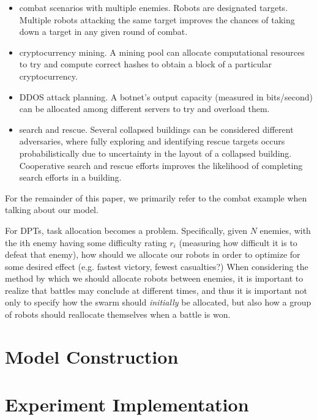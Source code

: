 \documentclass[11pt]{article}
\theoremstyle{definition}
\begin{document}
\begin{itemize}
    \item combat scenarios with multiple enemies.
        Robots are designated targets. Multiple
        robots attacking the same target
        improves the chances of taking down
        a target in any given round of combat.
    \item cryptocurrency mining. A mining pool
        can allocate computational resources to
        try and compute correct hashes to
        obtain a block of a particular
        cryptocurrency.
    \item DDOS attack planning. A botnet's
        output capacity (measured in bits/second)
        can be allocated among different servers
        to try and overload them.
    \item search and rescue. Several collapsed
        buildings can be considered different
        adversaries, where fully exploring
        and identifying rescue targets occurs
        probabilistically due to uncertainty
        in the layout of a collapsed building.
        Cooperative search and rescue efforts improves
        the likelihood of completing search efforts
        in a building.
\end{itemize}

For the remainder of this paper, we primarily
refer to the combat example when talking about
our model.

For DPTs, task allocation becomes a problem.
Specifically, given $ N $ enemies,
with the ith enemy having some difficulty
rating $ r_i $ (measuring how difficult it is
to defeat that enemy), how should we allocate our robots
in order to optimize for some desired effect
(e.g. fastest victory, fewest casualties?)
When considering the method by which we should allocate
robots between enemies, it is important to realize
that battles may conclude at different times, and
thus it is important not only to specify how the
swarm should \emph{initially} be allocated,
but also how a group of robots should reallocate
themselves when a battle is won.

\section{Model Construction}
\label{sec:model}

\section{Experiment Implementation}
\label{sec:implementation}
\end{document}
